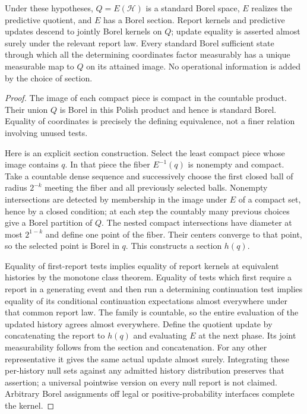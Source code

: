 \begin{proposition}\label{prop:quotient}
Under these hypotheses, $Q=E(\mathcal H)$ is a standard Borel space, $E$ realizes the predictive quotient, and $E$ has a Borel section. Report kernels and predictive updates descend to jointly Borel kernels on $Q$; update equality is asserted almost surely under the relevant report law. Every standard Borel sufficient state through which all the determining coordinates factor measurably has a unique measurable map to $Q$ on its attained image. No operational information is added by the choice of section.
\end{proposition}
\begin{proof}
The image of each compact piece is compact in the countable product. Their union $Q$ is Borel in this Polish product and hence is standard Borel. Equality of coordinates is precisely the defining equivalence, not a finer relation involving unused tests.

Here is an explicit section construction. Select the least compact piece whose image contains $q$. In that piece the fiber $E^{-1}(q)$ is nonempty and compact. Take a countable dense sequence and successively choose the first closed ball of radius $2^{-k}$ meeting the fiber and all previously selected balls. Nonempty intersections are detected by membership in the image under $E$ of a compact set, hence by a closed condition; at each step the countably many previous choices give a Borel partition of $Q$. The nested compact intersections have diameter at most $2^{1-k}$ and define one point of the fiber. Their centers converge to that point, so the selected point is Borel in $q$. This constructs a section $h(q)$.

Equality of first-report tests implies equality of report kernels at equivalent histories by the monotone class theorem. Equality of tests which first require a report in a generating event and then run a determining continuation test implies equality of its conditional continuation expectations almost everywhere under that common report law. The family is countable, so the entire evaluation of the updated history agrees almost everywhere. Define the quotient update by concatenating the report to $h(q)$ and evaluating $E$ at the next phase. Its joint measurability follows from the section and concatenation. For any other representative it gives the same actual update almost surely. Integrating these per-history null sets against any admitted history distribution preserves that assertion; a universal pointwise version on every null report is not claimed. Arbitrary Borel assignments off legal or positive-probability interfaces complete the kernel.


\end{proof}
